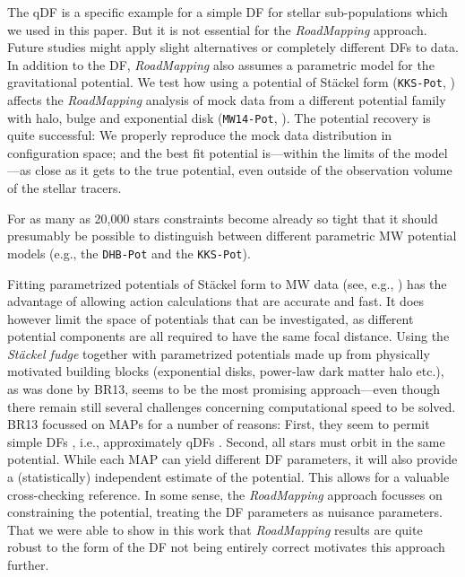 \documentclass[iop,revtex4,numberedappendix,appendixfloats]{emulateapj}
\newcommand{\MAP}{MAP}
\newcommand{\MAPs}{MAPs}
\newcommand{\RM}{{\sl RoadMapping}}
\begin{document}
The qDF is a specific example for a simple DF for stellar sub-populations which we used in this paper. But it is not essential for the \RM{} approach. Future studies might apply slight alternatives or completely different DFs to data.\\

 In addition to the DF, \RM{} also assumes a parametric model for the gravitational potential. We test how using a potential of St\"{a}ckel form (\texttt{KKS-Pot}, \citealt{1994AA...287...43B}) affects the \RM{} analysis of mock data from a different potential family with halo, bulge and exponential disk (\texttt{MW14-Pot}, \citealt{2015ApJS..216...29B}). The potential recovery is quite successful: We properly reproduce the mock data distribution in configuration space; and the best fit potential is---within the limits of the model---as close as it gets to the true potential, even outside of the observation volume of the stellar tracers. 

For as many as 20,000 stars constraints become already so tight that it should presumably be possible to distinguish between different parametric MW potential models (e.g., the \texttt{DHB-Pot} and the \texttt{KKS-Pot}).

Fitting parametrized potentials of St\"{a}ckel form to MW data (see, e.g., \citealt{1994AA...287...43B,2003MNRAS.340..752F}) has the advantage of allowing action calculations that are accurate and fast. It does however limit the space of potentials that can be investigated, as different potential components are all required to have the same focal distance. Using the \emph{St\"{a}ckel fudge} \citep{2012MNRAS.426.1324B} together with parametrized potentials made up from physically motivated building blocks (exponential disks, power-law dark matter halo etc.), as was done by BR13, seems to be the most promising approach---even though there remain still several challenges concerning computational speed to be solved.\\

 BR13 focussed on \MAPs{} for a number of reasons: First, they seem to permit simple DFs \citep{2012ApJ...751..131B,2012ApJ...755..115B,2012ApJ...753..148B}, i.e., approximately qDFs \citep{2013MNRAS.434..652T}. Second, all stars must orbit in the same potential. While each \MAP{} can yield different DF parameters, it will also provide a (statistically) independent estimate of the potential. This allows for a valuable cross-checking reference. In some sense, the \RM{} approach focusses on constraining the potential, treating the DF parameters as nuisance parameters. That we were able to show in this work that \RM{} results are quite robust to the form of the DF not being entirely correct motivates this approach further. 
\end{document}

